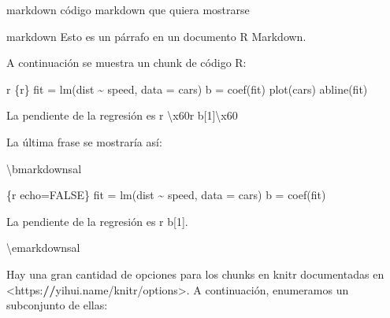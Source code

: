 \documentclass[11pt,a4paper,oneside,]{article}
\newenvironment{Shaded}{\begin{snugshade}}{\end{snugshade}}
\newcommand{\AttributeTok}[1]{\textcolor[rgb]{0.77,0.63,0.00}{#1}}
\newcommand{\ErrorTok}[1]{\textcolor[rgb]{0.64,0.00,0.00}{\textbf{#1}}}
\newcommand{\NormalTok}[1]{#1}
\newcommand{\SpecialCharTok}[1]{\textcolor[rgb]{0.00,0.00,0.00}{#1}}
\newcommand{\StringTok}[1]{\textcolor[rgb]{0.31,0.60,0.02}{#1}}
\numberwithin{dummy}{section}
\theoremstyle{ocrenumbox}
\theoremstyle{blacknumex}
\theoremstyle{blacknumbox}
\theoremstyle{ocrenum}
\theoremstyle{ocrenum}
\begin{document}
\begin{Shaded}
\begin{Highlighting}[numbers=left,,]
\StringTok{\textasciigrave{}\textasciigrave{}\textasciigrave{}\textasciigrave{}\textasciigrave{}}

\StringTok{\textasciigrave{}\textasciigrave{}\textasciigrave{}\textasciigrave{}}\AttributeTok{markdown}
\AttributeTok{código markdown que quiera mostrarse}

\StringTok{\textasciigrave{}\textasciigrave{}\textasciigrave{}\textasciigrave{}}

\StringTok{\textasciigrave{}\textasciigrave{}\textasciigrave{}\textasciigrave{}\textasciigrave{}}

\StringTok{\textasciigrave{}\textasciigrave{}\textasciigrave{}\textasciigrave{}}\NormalTok{markdown}
\NormalTok{Esto es un párrafo en un documento R Markdown.}

\NormalTok{A continuación se muestra un chunk de código R}\SpecialCharTok{:}

\StringTok{\textasciigrave{}}\AttributeTok{r \textquotesingle{}\textquotesingle{}}\StringTok{\textasciigrave{}\textasciigrave{}\textasciigrave{}\textasciigrave{}}\AttributeTok{\{r\}}
\AttributeTok{fit = lm(dist \textasciitilde{} speed, data = cars)}
\AttributeTok{b   = coef(fit)}
\AttributeTok{plot(cars)}
\AttributeTok{abline(fit)}
\StringTok{\textasciigrave{}\textasciigrave{}\textasciigrave{}}

\NormalTok{La pendiente de la regresión es }\StringTok{\textasciigrave{}}\AttributeTok{r \textquotesingle{}}\SpecialCharTok{\textbackslash{}x60}\AttributeTok{r b[1]}\SpecialCharTok{\textbackslash{}x60}\AttributeTok{\textquotesingle{}}\StringTok{\textasciigrave{}}

\StringTok{\textasciigrave{}\textasciigrave{}\textasciigrave{}\textasciigrave{}}

\NormalTok{La última frase se mostraría así}\SpecialCharTok{:}

\NormalTok{\textbackslash{}bmarkdownsal}

\StringTok{\textasciigrave{}\textasciigrave{}\textasciigrave{}}\AttributeTok{\{r echo=FALSE\}}
\AttributeTok{fit = lm(dist \textasciitilde{} speed, data = cars)}
\AttributeTok{b   = coef(fit)}
\StringTok{\textasciigrave{}\textasciigrave{}\textasciigrave{}}

\NormalTok{La pendiente de la regresión es }\StringTok{\textasciigrave{}}\AttributeTok{r b[1]}\StringTok{\textasciigrave{}}\NormalTok{.}

\NormalTok{\textbackslash{}emarkdownsal}


\NormalTok{Hay una gran cantidad de opciones para los chunks en knitr documentadas en }\SpecialCharTok{\textless{}}\NormalTok{https}\SpecialCharTok{:}\ErrorTok{//}\NormalTok{yihui.name}\SpecialCharTok{/}\NormalTok{knitr}\SpecialCharTok{/}\NormalTok{options}\SpecialCharTok{\textgreater{}}\NormalTok{. }
\NormalTok{A continuación, enumeramos un subconjunto de ellas}\SpecialCharTok{:}


\end{Highlighting}
\end{Shaded}
\end{document}
